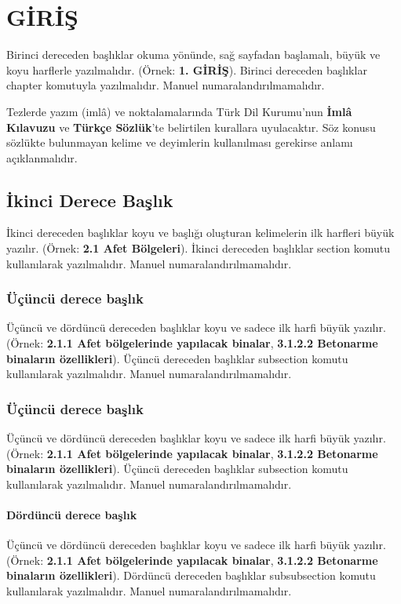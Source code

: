 \documentclass[a4paper,oneside,12pt]{report}
\begin{document}
\chapter{GİRİŞ}
\label{chapter:introduction}
\onehalfspacing

Birinci dereceden başlıklar okuma yönünde, sağ sayfadan başlamalı, büyük ve koyu harflerle yazılmalıdır. (Örnek: \textbf{1. GİRİŞ}). Birinci dereceden başlıklar chapter komutuyla yazılmalıdır. Manuel numaralandırılmamalıdır.

Tezlerde yazım (imlâ) ve noktalamalarında Türk Dil Kurumu’nun \textbf{İmlâ Kılavuzu} ve \textbf{Türkçe Sözlük}’te belirtilen kurallara uyulacaktır. Söz konusu sözlükte bulunmayan kelime ve deyimlerin kullanılması gerekirse anlamı açıklanmalıdır.

\section{İkinci Derece Başlık}
\label{section:ikinci}
İkinci dereceden başlıklar koyu ve başlığı oluşturan kelimelerin ilk harfleri büyük
yazılır. (Örnek: \textbf{2.1 Afet Bölgeleri}). İkinci dereceden başlıklar section komutu kullanılarak yazılmalıdır. Manuel numaralandırılmamalıdır.

\lipsum[1 -3]

\subsection{Üçüncü derece başlık}
\label{section:ucuncu}
Üçüncü ve dördüncü dereceden başlıklar koyu ve sadece ilk harfi büyük yazılır.
(Örnek: \textbf{2.1.1 Afet bölgelerinde yapılacak binalar}, \textbf{3.1.2.2 Betonarme binaların özellikleri}). Üçüncü dereceden başlıklar subsection komutu kullanılarak yazılmalıdır. Manuel numaralandırılmamalıdır.

\lipsum[1][1 -6]
\subsection{Üçüncü derece başlık}
\label{section:ucuncu2}
Üçüncü ve dördüncü dereceden başlıklar koyu ve sadece ilk harfi büyük yazılır.
(Örnek: \textbf{2.1.1 Afet bölgelerinde yapılacak binalar}, \textbf{3.1.2.2 Betonarme binaların özellikleri}). Üçüncü dereceden başlıklar subsection komutu kullanılarak yazılmalıdır. Manuel numaralandırılmamalıdır.

\lipsum[1][1 -6]

\subsubsection{Dördüncü derece başlık}
\label{section:dorduncu}
Üçüncü ve dördüncü dereceden başlıklar koyu ve sadece ilk harfi büyük yazılır.
(Örnek: \textbf{2.1.1 Afet bölgelerinde yapılacak binalar}, \textbf{3.1.2.2 Betonarme binaların özellikleri}). Dördüncü dereceden başlıklar subsubsection komutu kullanılarak yazılmalıdır. Manuel numaralandırılmamalıdır.
\end{document}
